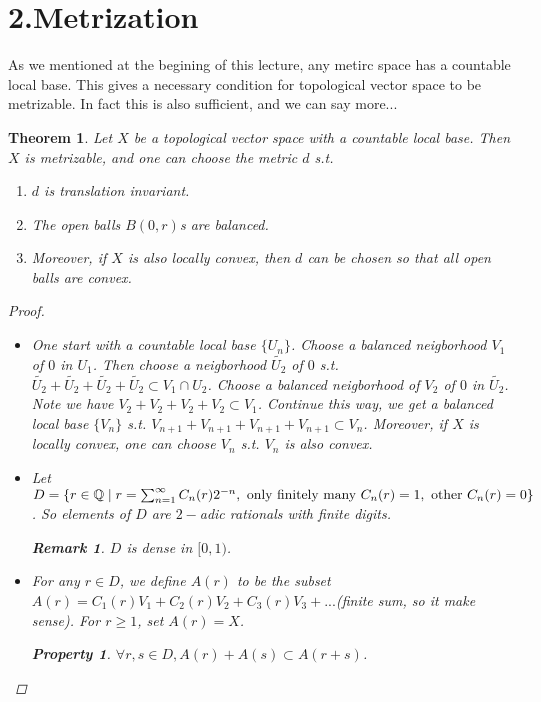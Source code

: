 \documentclass{article}
\newtheorem*{property}{Property}
\newtheorem*{remark}{Remark}
\newtheorem*{theorem}{Theorem}
\begin{document}
\section*{2.Metrization}
As we mentioned at the begining of this lecture, any metirc space has a countable local base.
This gives a necessary condition for topological vector space to be metrizable. In fact this is also sufficient,
and we can say more...
\begin{theorem}
  Let $X$ be a topological vector space with a countable local base.
  Then $X$ is metrizable, and one can choose the metric $d$ s.t.
  \begin{enumerate}
    \item $d$ is translation invariant.
    \item The open balls $B(0, r)$s are balanced.
    \item Moreover, if $X$ is also locally convex, then $d$ can be chosen so that all open balls are convex.
  \end{enumerate}
  \begin{proof} \hfill
    \begin{itemize}
      \item One start with a countable local base $\{U_n\}$.
      Choose a balanced neigborhood $V_1$ of $0$ in $U_1$.
      Then choose a neigborhood $\tilde{U_{2}}$ of $0$ s.t. 
      $\tilde{U_{2}} + \tilde{U_{2}} + \tilde{U_{2}} + \tilde{U_{2}} \subset V_1 \cap U_2$.
      Choose a balanced neigborhood of $V_2$ of $0$ in $\tilde{U_2}$. 
      Note we have $V_2 + V_2 + V_2 + V_2 \subset V_1$.
      Continue this way, we get a balanced local base $\{V_n\}$ s.t. 
      $V_{n+1} + V_{n+1} + V_{n+1} + V_{n+1} \subset V_{n}$.
      Moreover, if $X$ is locally convex, one can choose $V_n$ s.t. $V_n$ is also convex.
      \item Let $D = \{r \in \mathbb{Q} \mid r=\sum_{n=1}^{\infty}{C_n(r)2^{-n}}, \textnormal{ only finitely many } C_n(r)=1,
      \textnormal{ other } C_n(r) = 0\}$. So elements of $D$ are $2-$adic rationals with finite digits.
      \begin{remark}
        $D$ is dense in $[0, 1)$.
      \end{remark}
      \item For any $r \in D$, we define $A(r)$ to be the subset
        $A(r) = C_1(r)V_1 + C_2(r)V_2 + C_3(r)V_3 + ...$(finite sum, so it make sense).
        For $r \ge 1$, set $A(r) = X$.
        \begin{property}
          $\forall r, s \in D,A(r) + A(s) \subset A(r+s)$.

\end{property}
\end{itemize}
\end{proof}
\end{theorem}
\end{document}
